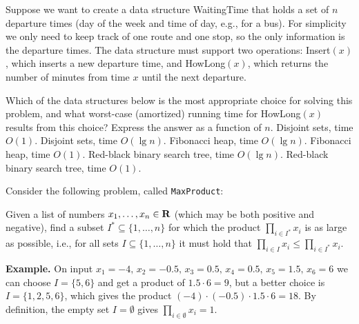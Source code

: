 Suppose we want to create a data structure {\sc WaitingTime} that holds a set of $n$ departure times (day of the week and time of day, e.g., for a bus).
For simplicity we only need to keep track of one route and one stop, so the only information is the departure times.
The data structure must support two operations: {\sc Insert}$(x)$, which inserts a new departure time, and {\sc HowLong}$(x)$, which returns the number of minutes from time $x$ until the next departure.

\medskip

Which of the data structures below is the most appropriate choice for solving this problem, and what worst-case (amortized) running time for {\sc HowLong}$(x)$ results from this choice?
Express the answer as a function of $n$.
\oneanswer
\optionsstart
\answer Disjoint sets, time $O(1)$.
\answer Disjoint sets, time $O(\lg n)$.
\answer Fibonacci heap, time $O(\lg n)$.
\answer Fibonacci heap, time $O(1)$.
\answer Red-black binary search tree, time $O(\lg n)$. \correct
\answer Red-black binary search tree, time $O(1)$.
\optionsend




\label{sec:maxproduct}
Consider the following problem, called {\tt MaxProduct}:
\newcommand{\maxproductproblem}{
Given a list of numbers $x_1,\dots,x_n \in {\bf R}$ (which may be both positive and negative),
find a subset $I^*\subseteq \{1,\dots,n\}$ for which the product $\prod_{i\in I^*} x_i$ is as large as possible, i.e., for all sets $I\subseteq \{1,\dots,n\}$ it must hold that $\prod_{i\in I} x_i \leq \prod_{i\in I^*} x_i$.

\medskip

{\bf Example.} On input $x_1=-4,\, x_2=-0.5,\, x_3=0.5,\, x_4=0.5,\, x_5=1.5,\, x_6=6$ we can choose $I=\{5,6\}$ and get a product of $1.5\cdot 6 = 9$, but a better choice is $I=\{1,2,5,6\}$, which gives the product $(-4) \cdot (-0.5) \cdot 1.5\cdot 6 = 18$. By definition, the empty set $I=\emptyset$ gives $\prod_{i\in \emptyset} x_i = 1$.
}

\maxproductproblem

